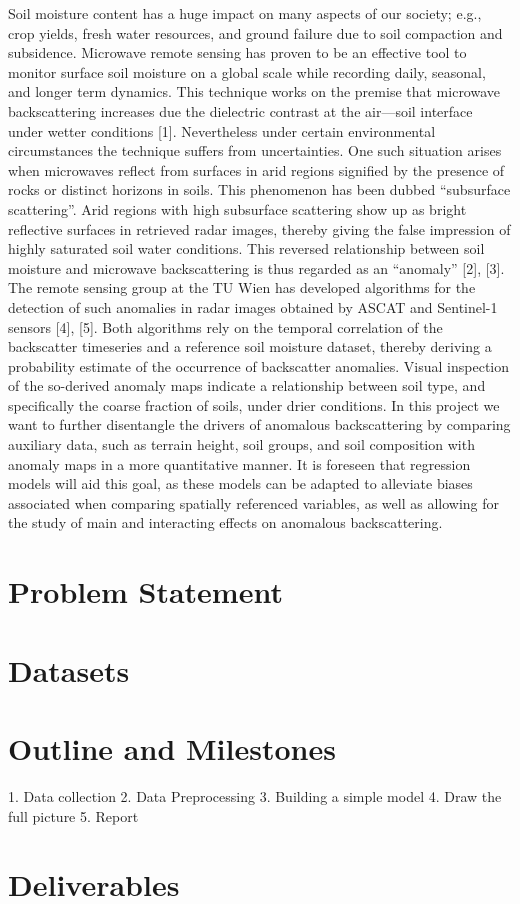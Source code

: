 \documentclass[12pt]{article}
\begin{document}
Soil moisture content has a huge impact on many aspects of our society; e.g.,  crop yields, fresh water resources, and ground failure due to soil compaction and subsidence. Microwave remote sensing has proven to be an effective tool to monitor surface soil moisture on a global scale while recording daily, seasonal, and  longer term dynamics. This technique works on the premise that microwave backscattering increases due the dielectric contrast at the air—soil interface under wetter conditions [1]. Nevertheless under certain environmental circumstances the technique suffers from uncertainties. One such situation arises when microwaves reflect from surfaces in arid regions signified by the presence of rocks or distinct horizons in soils. This phenomenon has been dubbed “subsurface scattering”. Arid regions with high subsurface scattering show up as bright reflective surfaces in retrieved radar images, thereby giving the false impression of highly saturated soil water conditions. This reversed relationship between soil moisture and microwave backscattering is thus regarded as an “anomaly” [2], [3]. The remote sensing group at the TU Wien has developed algorithms for the detection of such anomalies in radar images obtained by ASCAT and Sentinel-1 sensors [4], [5]. Both algorithms rely on the temporal correlation of the backscatter timeseries and a reference soil moisture dataset, thereby deriving a probability estimate of the occurrence of backscatter anomalies.  Visual inspection of the so-derived anomaly maps indicate a relationship between soil type, and specifically the coarse fraction of soils, under drier conditions. In this project we want to further disentangle the drivers of anomalous backscattering by comparing auxiliary data, such as terrain height, soil groups, and soil composition with anomaly maps in a more quantitative manner. It is foreseen that regression models will aid this goal, as these models can be adapted to alleviate biases associated when comparing spatially referenced variables, as well as allowing for the study of main and interacting effects on anomalous backscattering.

\section{Problem Statement}

\section{Datasets}

\section{Outline and Milestones}
1. Data collection
2. Data Preprocessing
3. Building a simple model
4. Draw the full picture
5. Report

\section{Deliverables}

\newpage

\printbibliography[title={References}]
\end{document}
